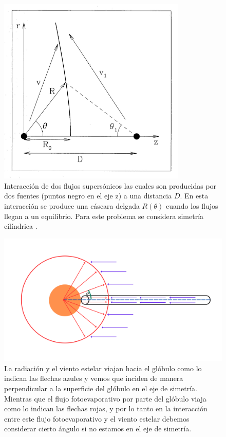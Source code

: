\documentclass{book}
\begin{document}
\begin{figure}[htb]
    \centering    \includegraphics[width=0.8\textwidth]{images Chapter 2/C2_Canto.jpg}
    \caption{Interacción de dos flujos supersónicos las cuales son
      producidas por dos fuentes (puntos negro en el eje z) a una
      distancia $D$. En esta interacción se produce una cáscara
      delgada $R(\theta)$ cuando los flujos llegan a un equilibrio. Para
      este problema se considera simetría cilíndrica
      \citep{Canto:1996}.}
    \label{fig:Canto1}
\end{figure}

\begin{figure}[htb]
    \centering    \includegraphics[width=\textwidth]{artesanales/ImgFi01-2.pdf}
    \caption{La radiación y el viento estelar viajan hacia el glóbulo
      como lo indican las flechas azules y vemos que inciden de manera
      perpendicular a la superficie del glóbulo en el eje de simetría.
      Mientras que el flujo fotoevaporativo por parte del glóbulo
      viaja como lo indican las flechas rojas, y por lo tanto en la
      interacción entre este flujo fotoevaporativo y el viento estelar
      debemos considerar cierto ángulo si no estamos en el eje de
      simetría.}
    \label{fig:cilindross}
\end{figure}
\end{document}
